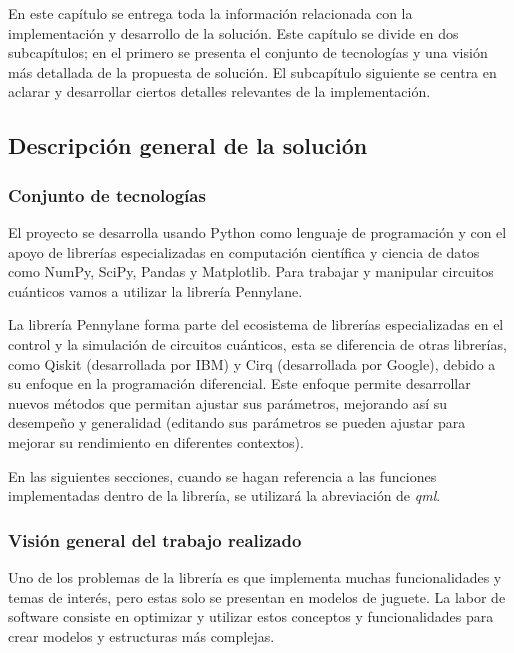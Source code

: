 En este capítulo se entrega toda la información relacionada con la implementación y desarrollo de la solución. Este capítulo se divide en dos subcapítulos; en el primero se presenta el conjunto de tecnologías y una visión más detallada de la propuesta de solución. El subcapítulo siguiente se centra en aclarar y desarrollar ciertos detalles relevantes de la implementación.


\subsection{Descripción general de la solución}

\subsubsection{Conjunto de tecnologías}
El proyecto se desarrolla usando Python como lenguaje de programación y con el apoyo de librerías especializadas en computación científica y ciencia de datos como NumPy, SciPy, Pandas y Matplotlib. Para trabajar y manipular circuitos cuánticos vamos a utilizar la librería Pennylane\cite{pennylane}.  

La librería Pennylane forma parte del ecosistema de librerías especializadas en el control y la simulación de circuitos cuánticos, esta se diferencia de otras librerías, como Qiskit (desarrollada por IBM) y Cirq (desarrollada por Google), debido a su enfoque en la programación diferencial. Este enfoque permite desarrollar nuevos métodos que permitan ajustar sus parámetros, mejorando así su desempeño y generalidad (editando sus parámetros se pueden ajustar para mejorar su rendimiento en diferentes contextos).

En las siguientes secciones, cuando se hagan referencia a las funciones implementadas dentro de la librería, se utilizará la abreviación de \textit{qml}.

\subsubsection{Visión general del trabajo realizado}
Uno de los problemas de la librería es que implementa muchas funcionalidades y temas de interés, pero estas solo se presentan en modelos de juguete. La labor de software consiste en optimizar y utilizar estos conceptos y funcionalidades para crear modelos y estructuras más complejas.


